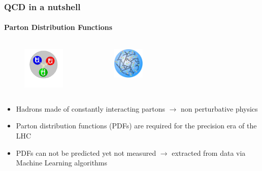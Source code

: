 \documentclass[aspectratio=43]{beamer}
\begin{document}
\begin{frame}
	
	\frametitle{QCD in a nutshell}
	\framesubtitle{Parton Distribution Functions}
	
	\begin{columns}
	
		
		\begin{figure}
			\includegraphics[width = 2cm]{plots/section1/proton.png}
		\end{figure}
		
	
		\begin{figure}
			\includegraphics[width = 1.5cm]{plots/section1/proton2.jpg}
		\end{figure}
	
	\end{columns}
	
	\vspace{0.5 cm}
	
	\footnotesize
	\begin{itemize}
		\item Hadrons made of constantly interacting partons $\longrightarrow$ non perturbative physics
		\item {\color{blue}Parton distribution functions (PDFs)} are required for the precision era of the LHC
		\item PDFs can not be predicted yet not measured $\longrightarrow$ {\color{blue} extracted from data via Machine Learning algorithms}
	\end{itemize}
	
\end{frame}

\begin{frame}


\end{frame}
\end{document}
